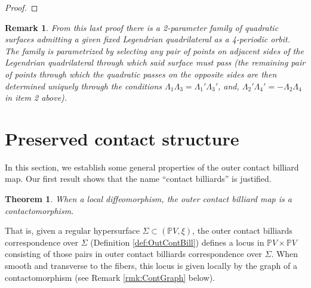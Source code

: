 \documentclass{article}
\newtheorem{thm}{Theorem}[section]
\newtheorem{rmk}{Remark}
\begin{document}
\begin{proof}

\end{proof}
\begin{rmk}
    From this last proof there is a 2-parameter family of quadratic surfaces admitting a 
    given fixed Legendrian quadrilateral as a 4-periodic orbit. The family is parametrized 
    by selecting any pair of points on adjacent sides of the Legendrian quadrilateral 
    through which said surface must pass (the remaining pair of points through which the 
    quadratic passes on the opposite sides are then determined uniquely through the 
    conditions $\Lambda_1\Lambda_3 = \Lambda_1'\Lambda_3'$, and, $\Lambda_2'\Lambda_4' =- 
    \Lambda_2\Lambda_4$ in item 2 above).
\end{rmk}


\section{Preserved contact structure}\label{sec:GenThms}

In this section, we establish some general properties of the outer contact billiard map. 
Our first result shows that the name ``contact billiards'' is justified.

\begin{thm}\label{thm:ContTransf}
    When a local diffeomorphism, the outer contact billiard map is a contactomorphism. 
\end{thm}

That is, given a regular hypersurface $\Sigma\subset (\mathbb{P}V,\xi)$, the outer contact billiards correspondence over $\Sigma$ (Definition \ref{def:OutContBill}) defines a locus in $\mathbb{P}V \times \mathbb{P}V$ consisting of those pairs in outer contact billiards correspondence over $\Sigma$. When smooth and transverse to the fibers, this locus is given locally by the graph of a contactomorphism (see Remark \ref{rmk:ContGraph} below).
\end{document}
